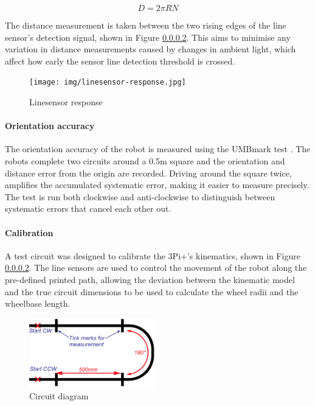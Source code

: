 \documentclass[conference]{IEEEtran}
\begin{document}
\begin{equation}
    D = 2 \pi R N
\end{equation}

The distance measurement is taken between the two rising edges of the line sensor's detection signal, shown in Figure \ref{}.
This aims to minimise any variation in distance measurements caused by changes in ambient light, which affect how early the sensor line detection threshold is crossed.

\begin{figure}[h!]
    \centering
    \texttt{[image: img/linesensor-response.jpg]}
    \caption{Linesensor response}
    \label{fig:linesensor}
\end{figure}

\paragraph{Orientation accuracy}
The orientation accuracy of the robot is measured using the UMBmark test \cite{UMBmark}. 
The robots complete two circuits around a 0.5m square and the orientation and distance error from the origin are recorded.
Driving around the square twice, amplifies the accumulated systematic error, making it easier to measure precisely. 
The test is run both clockwise and anti-clockwise to distinguish between systematic errors that cancel each other out.

\paragraph{Calibration}
A test circuit was designed to calibrate the 3Pi+’s kinematics, shown in Figure \ref{}. 
The line sensors are used to control the movement of the robot along the pre-defined printed path, allowing the deviation between the kinematic model and the true circuit dimensions to be used to calculate the wheel radii and the wheelbase length.

\begin{figure}[h!]
    \centering
    \includegraphics[width = 0.49\textwidth]{img/calibration_circuit.png}
    \caption{Circuit diagram}
    \label{fig:calibration_circuit}
\end{figure}
\end{document}
